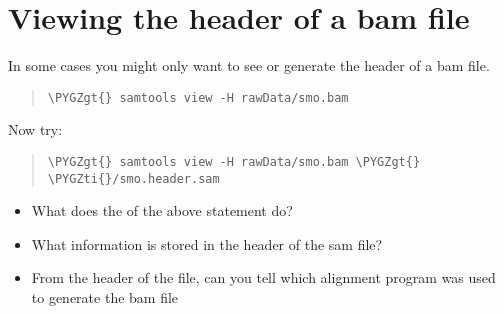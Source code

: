 \documentclass[a4paper,11pt,english]{sphinxmanual}
\def\PYGZgt{\char`\>}
\def\PYGZti{\char`\~}
\begin{document}
\section{Viewing the header of a bam file}
\label{exercises/STEP3_viewManipulateAlignmentData_samtools:viewing-the-header-of-a-bam-file}
In some cases you might only want to see or generate the header of a bam file.
\begin{quote}

\begin{Verbatim}[frame=single, rulecolor=\color{lightgray}, fontfamily=courier, commandchars=\\\{\}]
\PYGZgt{} samtools view -H rawData/smo.bam
\end{Verbatim}
\end{quote}

Now try:
\begin{quote}

\begin{Verbatim}[frame=single, rulecolor=\color{lightgray}, fontfamily=courier, commandchars=\\\{\}]
\PYGZgt{} samtools view -H rawData/smo.bam \PYGZgt{} \PYGZti{}/smo.header.sam
\end{Verbatim}
\end{quote}
\begin{itemize}
\item {} 
What does the  of the above statement do?

\item {} 
What information is stored in the header of the sam file?

\item {} 
From the header of the file, can you tell which alignment program was used to generate the bam file

\end{itemize}
\end{document}
